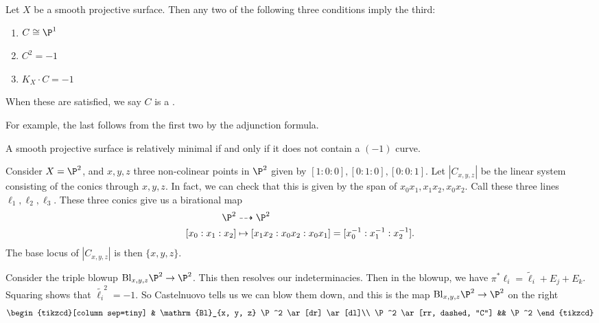 \documentclass[a4paper]{article}
\newcommand\Bl{\mathrm{Bl}}
\begin{document}
\begin{ex}
  Let $X$ be a smooth projective surface. Then any two of the following three conditions imply the third:
  \begin{enumerate}
    \item $C \cong \P^1$
    \item $C^2 = -1$
    \item $K_X \cdot C = -1$
  \end{enumerate}
  When these are satisfied, we say $C$ is a .
\end{ex}
For example, the last follows from the first two by the adjunction formula.

\begin{cor}
  A smooth projective surface is relatively minimal if and only if it does not contain a $(-1)$ curve. 
\end{cor}

\begin{eg}
  Consider $X = \P^2$, and $x, y, z$ three non-colinear points in $\P^2$ given by $[1:0:0], [0:1:0], [0:0:1]$. Let $|C_{x, y, z}|$ be the linear system consisting of the conics through $x, y, z$. In fact, we can check that this is given by the span of $x_0 x_1, x_1 x_2, x_0 x_2$. Call these three lines $\ell_1, \ell_2, \ell_3$. These three conics give us a birational map
  \begin{align*}
    \P^2 &\dashrightarrow \P^2\\
    [x_0:x_1:x_2] & \mapsto [x_1 x_2: x_0 x_2: x_0 x_1] = [x_0^{-1}:x_1^{-1}:x_2^{-1}].
  \end{align*}
  The base locus of $|C_{x, y, z}|$ is then $\{x, y, z\}$.

  Consider the triple blowup $\Bl_{x, y, z} \P^2 \to \P^2$. This then resolves our indeterminacies. Then in the blowup, we have $\pi^* \ell_i = \tilde{\ell}_i + E_j + E_k$. Squaring shows that $\tilde{\ell_i}^2 = -1$. So Castelnuovo tells us we can blow them down, and this is the map $\Bl_{x, y, z} \P^2 \to \P^2$ on the right %
  \[
    \begin{tikzcd}[column sep=tiny]
      & \Bl_{x, y, z} \P^2 \ar[dr] \ar[dl]\\
      \P^2 \ar[rr, dashed, "C"] && \P^2
    \end{tikzcd}
  \]
\end{eg}
\end{document}
